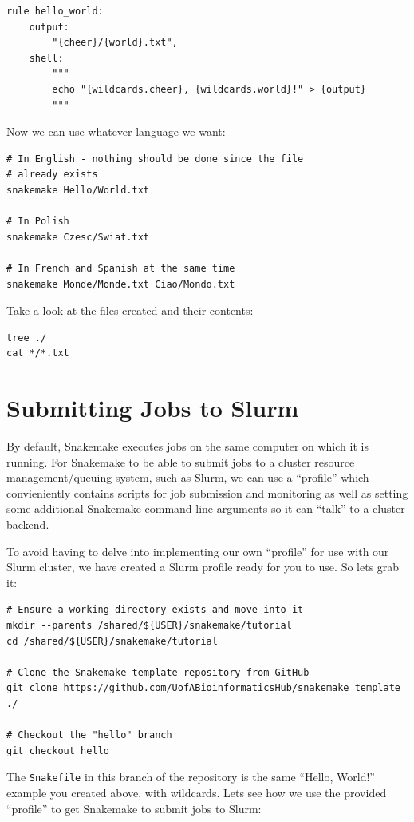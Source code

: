 \begin{lstlisting}
rule hello_world:
	output:
		"{cheer}/{world}.txt",
	shell:
		"""
		echo "{wildcards.cheer}, {wildcards.world}!" > {output}
		"""
\end{lstlisting}

Now we can use whatever language we want:

\begin{lstlisting}
# In English - nothing should be done since the file
# already exists
snakemake Hello/World.txt

# In Polish
snakemake Czesc/Swiat.txt

# In French and Spanish at the same time
snakemake Monde/Monde.txt Ciao/Mondo.txt
\end{lstlisting}

Take a look at the files created and their contents:

\begin{lstlisting}
tree ./
cat */*.txt
\end{lstlisting}

\section{Submitting Jobs to Slurm}

By default, Snakemake executes jobs on the same computer on which it is running. For Snakemake to be able to
submit jobs to a cluster resource management/queuing system, such as Slurm, we can use a ``profile'' which
convieniently contains scripts for job submission and monitoring as well as setting some additional Snakemake
command line arguments so it can ``talk'' to a cluster backend.

To avoid having to delve into implementing our own ``profile'' for use with our Slurm cluster, we have created
a Slurm profile ready for you to use. So lets grab it:

\begin{lstlisting}
# Ensure a working directory exists and move into it
mkdir --parents /shared/${USER}/snakemake/tutorial
cd /shared/${USER}/snakemake/tutorial

# Clone the Snakemake template repository from GitHub
git clone https://github.com/UofABioinformaticsHub/snakemake_template ./

# Checkout the "hello" branch
git checkout hello
\end{lstlisting}

The \texttt{Snakefile} in this branch of the repository is the same ``Hello, World!'' example you created above,
with wildcards. Lets see how we use the provided ``profile'' to get Snakemake to submit jobs to Slurm:


